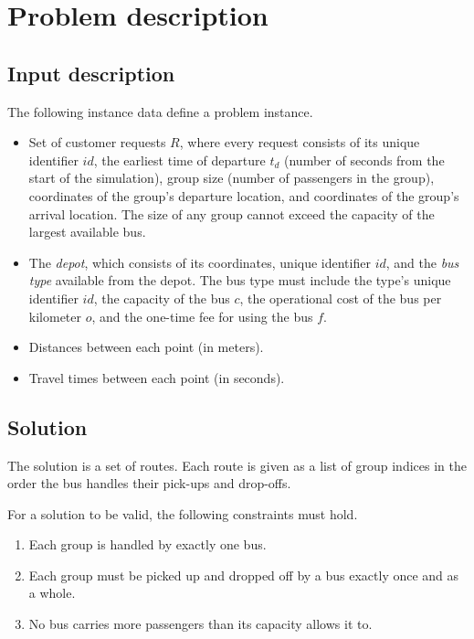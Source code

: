 \chapter{Problem description}

\section{Input description}

The following instance data define a problem instance.

\begin{itemize}
    \item Set of customer requests $R$, where every request consists of its unique identifier $id$, the earliest time of departure $t_d$ (number of seconds from the start of the simulation), group size (number of passengers in the group), coordinates of the group's departure location, and coordinates of the group's arrival location. The size of any group cannot exceed the capacity of the largest available bus.
    \item The \textit{depot}, which consists of its coordinates, unique identifier $id$, and the \textit{bus type} available from the depot. The bus type must include the type's unique identifier $id$, the capacity of the bus $c$, the operational cost of the bus per kilometer $o$, and the one-time fee for using the bus $f$.
    \item Distances between each point (in meters).
    \item Travel times between each point (in seconds).
\end{itemize}


\section{Solution} \label{sec:solution}

The solution is a set of routes. Each route is given as a list of group indices in the order the bus handles their pick-ups and drop-offs.

For a solution to be valid, the following constraints must hold.

\begin{enumerate}[(1)]\label{constraints}
    \setlength\itemsep{0pt}
    \item Each group is handled by exactly one bus.
    \item Each group must be picked up and dropped off by a bus exactly once and as a whole.
    \item No bus carries more passengers than its capacity allows it to.
\end{enumerate}

